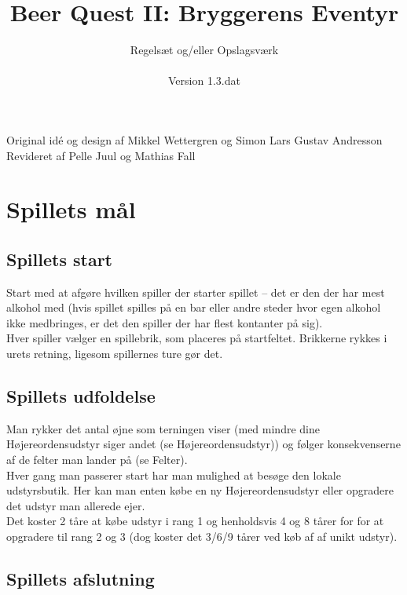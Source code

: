\documentclass{article}
\title{Beer Quest II: Bryggerens Eventyr}
\author{Regelsæt og/eller Opslagsværk
\\ \\ Version 1.3.dat}
\date{}
\begin{document}
\maketitle

\begin{center}
Original idé og design af Mikkel Wettergren og Simon Lars Gustav Andresson \\
Revideret af Pelle Juul og Mathias Fall
\end{center}

\tableofcontents
\pagebreak

\section{Spillets mål}

\subsection{Spillets start}
 
Start med at afgøre hvilken spiller der starter spillet – det er den der har mest alkohol med (hvis spillet spilles på en bar eller andre steder hvor egen alkohol ikke medbringes, er det den spiller der har flest kontanter på sig).\\
Hver spiller vælger en spillebrik, som placeres på startfeltet. Brikkerne rykkes i urets retning, ligesom spillernes ture gør det. 

\subsection{Spillets udfoldelse}

Man rykker det antal øjne som terningen viser (med mindre dine Højereordensudstyr siger andet (se Højereordensudstyr)) og følger konsekvenserne af de felter man lander på (se Felter).
\\ Hver gang man passerer start har man mulighed at besøge den lokale udstyrsbutik. Her kan man enten købe en ny Højereordensudstyr eller opgradere det udstyr man allerede ejer. \\ Det koster 2 tåre at købe udstyr i rang 1 og henholdsvis 4 og 8 tårer for for at opgradere til rang 2 og 3 (dog koster det 3/6/9 tårer ved køb af af unikt udstyr).

\subsection{Spillets afslutning}
\end{document}
